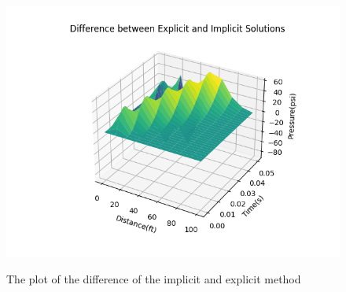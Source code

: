 \documentclass[12pt]{article}
\begin{document}
\begin{figure}
\begin{center}
\includegraphics[width=\textwidth]{difference_solution.png}
\caption{The plot of the difference of the implicit and explicit method}{\label{fig: problem-2-c}}
\end{center}
\end{figure}
\end{document}
